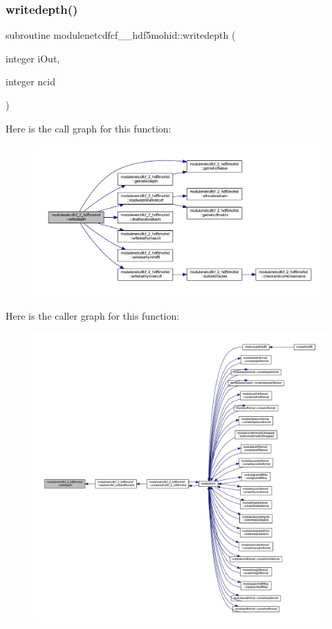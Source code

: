 \subsubsection{\texorpdfstring{writedepth()}{writedepth()}}
{\footnotesize\ttfamily subroutine modulenetcdfcf\+\_\+\_\+hdf5mohid\+::writedepth (\begin{DoxyParamCaption}\item[{integer}]{i\+Out,  }\item[{integer}]{ncid }\end{DoxyParamCaption})\hspace{0.3cm}{\ttfamily [private]}}

Here is the call graph for this function\+:\nopagebreak
\begin{figure}[H]
\begin{center}
\leavevmode
\includegraphics[width=350pt]{namespacemodulenetcdfcf__2__hdf5mohid_abb91469d951de000f7fa64d1cb05d626_cgraph}
\end{center}
\end{figure}
Here is the caller graph for this function\+:\nopagebreak
\begin{figure}[H]
\begin{center}
\leavevmode
\includegraphics[width=350pt]{namespacemodulenetcdfcf__2__hdf5mohid_abb91469d951de000f7fa64d1cb05d626_icgraph}
\end{center}
\end{figure}
